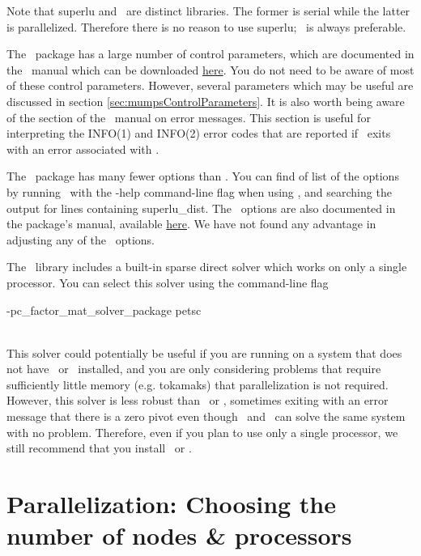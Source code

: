 Note that {\ttfamily superlu} and \superludist~are distinct libraries. The former is serial while the latter is parallelized.
Therefore there is no reason to use {\ttfamily superlu}; \superludist~is always preferable.

The \mumps~package has a large number of control parameters, which are documented in the \mumps~manual which can be downloaded \href{http://mumps-solver.org/}{here}.
You do not need to be aware of most of these control parameters.
However, several parameters which may be useful are discussed in section \ref{sec:mumpsControlParameters}.
It is also worth being aware of the section of the \mumps~manual on error messages. 
This section is useful for interpreting the {\ttfamily INFO(1)} and {\ttfamily INFO(2)} error codes that
are reported if \sfincs~exits with an error associated with \mumps. 

The \superludist~package has many fewer options than \mumps. 
You can find of list of the options by running \sfincs~with the {\ttfamily -help} command-line flag when
using \superludist, and searching the output for lines containing {\ttfamily superlu\_dist}.
The \superludist~options are also documented in the package's manual, available \href{http://crd-legacy.lbl.gov/~xiaoye/SuperLU/#superlu_dist}{here}.
We have not found any advantage in adjusting
any of the \superludist~options.

The \PETSc~library includes a built-in sparse direct solver which works on only a single processor.
You can select this solver using the command-line flag \\
\centerline{\ttfamily -pc\_factor\_mat\_solver\_package petsc}\\
This solver could potentially be useful if you are running on a system that does not have \mumps~or \superludist~installed,
and you are only considering problems that require sufficiently little memory (e.g. tokamaks) that parallelization is not required.
However, this solver is less robust than \mumps~or \superludist, sometimes exiting with an error message that there is a zero pivot
even though  \mumps~and \superludist~can solve the same system with no problem. Therefore, even if you plan to use only a single processor,
we still recommend that you install  \mumps~or \superludist.

\section{Parallelization: Choosing the number of nodes \& processors}
\label{sec:parallelization}

